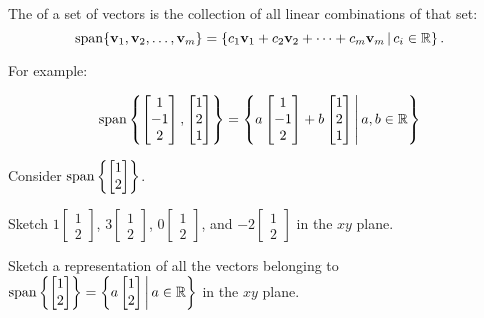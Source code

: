 \begin{applicationActivities}
\begin{definition}
  The  of a set of vectors is the collection of all linear
  combinations of that set:
  \[
    \operatorname{span}\{\mathbf v_1,\mathbf v_2,\dots,\mathbf v_m\} =
    \left\{c_1\mathbf v_1+c_2\mathbf v_2+\dots+c_m\mathbf v_m\,\middle|\,
    c_i\in\mathbb{R}\right\}.
  \]

	\vspace{2em}

  For example:

  \[
    \operatorname{span}\left\{
      \begin{bmatrix} 1 \\ -1 \\ 2 \end{bmatrix},
      \begin{bmatrix} 1 \\ 2 \\ 1 \end{bmatrix}
    \right\} = \left\{
      a\begin{bmatrix} 1 \\ -1 \\ 2 \end{bmatrix}+
      b\begin{bmatrix} 1 \\ 2 \\ 1 \end{bmatrix}
    \,\middle|\,
      a,b\in\mathbb{R}
    \right\}
  \]
\end{definition}

\begin{activity}{10}
  Consider \(\operatorname{span}\left\{\begin{bmatrix}1\\2\end{bmatrix}\right\}\).
  \begin{subactivity}
    Sketch
    \(1\begin{bmatrix}1\\2\end{bmatrix}\),
    \(3\begin{bmatrix}1\\2\end{bmatrix}\),
    \(0\begin{bmatrix}1\\2\end{bmatrix}\),
    and \(-2\begin{bmatrix}1\\2\end{bmatrix}\) in the \(xy\) plane.
  \end{subactivity}
  \begin{subactivity}
    Sketch a representation of all the vectors belonging to
    \(
      \operatorname{span}\left\{\begin{bmatrix}1\\2\end{bmatrix}\right\}
        =
      \left\{a\begin{bmatrix}1\\2\end{bmatrix}\,\middle|\,a\in\mathbb{R}\right\}
    \)
    in the \(xy\) plane.
  \end{subactivity}
\end{activity}






\end{applicationActivities}
